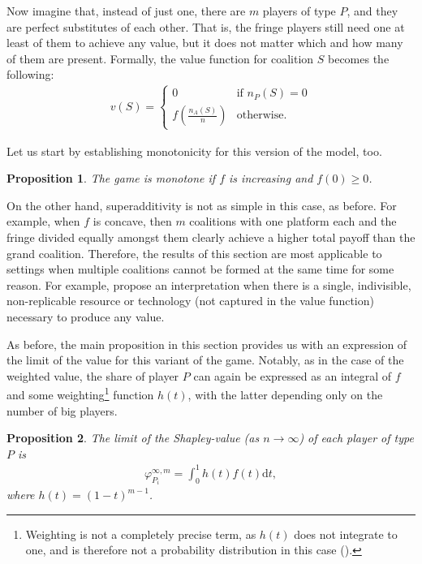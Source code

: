 \documentclass[a4paper]{article}
\newtheorem{proposition}{Proposition}
\newcommand{\dt}{\mathrm{d}t}
\begin{document}
Now imagine that, instead of just one, there are $m$ players of type $P$, and they are perfect substitutes of each other.
That is, the fringe players still need one at least of them to achieve any value, but it does not matter which and how many of them are present.
Formally, the value function for coalition $S$ becomes the following:
\begin{align*}
    v(S) = \begin{cases}
        0                              & \text{if } n_P(S) = 0 \\
        f\left(\frac{n_A(S)}{n}\right) & \text{otherwise}.
    \end{cases}
\end{align*}

Let us start by establishing monotonicity for this version of the model, too.
\begin{proposition}
    The game is monotone if $f$ is increasing and $f(0) \geq 0$.
\end{proposition}
On the other hand, superadditivity is not as simple in this case, as before.
For example, when $f$ is concave, then $m$ coalitions with one platform each and the fringe divided equally amongst them clearly achieve a higher total payoff than the grand coalition.
Therefore, the results of this section are most applicable to settings when multiple coalitions cannot be formed at the same time for some reason.
For example, \textcite{hart1996bargaining} propose an interpretation when there is a single, indivisible, non-replicable resource or technology (not captured in the value function) necessary to produce any value.

As before, the main proposition in this section provides us with an expression of the limit of the value for this variant of the game.
Notably, as in the case of the weighted value, the share of player $P$ can again be expressed as an integral of $f$ and some weighting\footnote{
    Weighting is not a completely precise term, as $h(t)$ does not integrate to one, and is therefore not a probability distribution in this case ().
} function $h(t)$, with the latter depending only on the number of big players.
\begin{proposition}
    \label{prop:multiple_platforms}
    The limit of the Shapley-value (as $n \to \infty$) of each player of type $P$ is
    \begin{align*}
        \varphi_{P_i}^{\infty, m} = \int_0^1 h(t) f(t) \dt,
    \end{align*}
    where $h(t) = (1-t) ^ {m-1}$.
\end{proposition}
\end{document}
